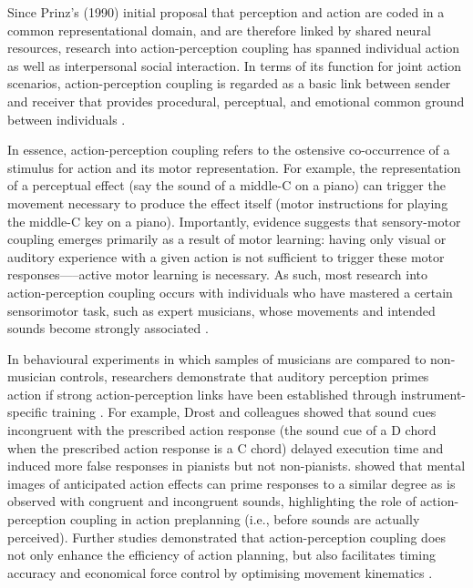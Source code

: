 \begin{CJK}{UTF8}{gbsn}
Since Prinz’s (1990) initial proposal that perception and action are coded in a common representational domain, and are therefore linked by shared neural resources, research into action-perception coupling has spanned individual action as well as interpersonal social interaction.
In terms of its function for joint action scenarios, action-perception coupling is regarded as a basic link between sender and receiver that provides procedural, perceptual, and emotional common ground between individuals \citep{Rizzolatti1998}.

In essence, action-perception coupling refers to the ostensive co-occurrence of a stimulus for action and its motor representation.  For example, the representation of a perceptual effect (say the sound of a middle-C on a piano) can trigger the movement necessary to produce the effect itself (motor instructions for playing the middle-C key on a piano).   Importantly, evidence suggests that sensory-motor coupling emerges primarily as a result of motor learning: having only visual \citep{Candidi2014} or auditory \citep{Lahav2007} experience with a given action is not sufficient to trigger these motor responses—--active motor learning is necessary.  As such, most research into action-perception coupling occurs with individuals who have mastered a certain sensorimotor task, such as expert musicians, whose movements and intended sounds become strongly associated \citep{Novembre2014}.

In behavioural experiments in which samples of musicians are compared to non-musician controls, researchers demonstrate that auditory perception primes action if strong action-perception links have been established through instrument-specific training \citep{Drost2005,Drost2005a,Drost2007}.  For example, Drost and colleagues showed that sound cues incongruent with the prescribed action response (the sound cue of a D chord when the prescribed action response is a C chord) delayed execution time \citep{Drost2005} and induced more false responses \citep[i.e., production of the heard chord, instead of the imperative one,][]{Drost2005a} in pianists but not non-pianists.  \textcite{Keller2006} showed that mental images of anticipated action effects can prime responses to a similar degree as is observed with congruent and incongruent sounds, highlighting the role of action-perception coupling in action preplanning (i.e., before sounds are actually perceived).  Further studies demonstrated that action-perception coupling does not only enhance the efficiency of action planning, but also facilitates timing accuracy and economical force control by optimising movement kinematics \citep{Keller2010}.


\end{CJK}

